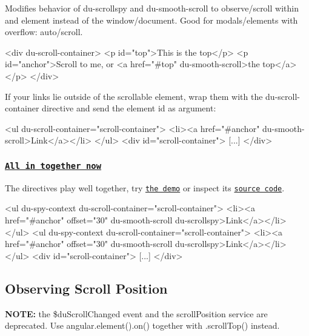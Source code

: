 Modifies behavior of {\ttfamily du-\/scrollspy} and {\ttfamily du-\/smooth-\/scroll} to observe/scroll within and element instead of the window/document. Good for modals/elements with {\ttfamily overflow\+: auto/scroll}.


\begin{DoxyCode}
<div du-scroll-container>
  <p id="top">This is the top</p>
  <p id="anchor">Scroll to me, or <a href="#top" du-smooth-scroll>the top</a></p>
</div>
\end{DoxyCode}


If your links lie outside of the scrollable element, wrap them with the {\ttfamily du-\/scroll-\/container} directive and send the element id as argument\+:


\begin{DoxyCode}
<ul du-scroll-container="scroll-container">
  <li><a href="#anchor" du-smooth-scroll>Link</a></li>
</ul>
<div id="scroll-container">
  [...]
</div>
\end{DoxyCode}


\subsubsection*{\href{http://www.youtube.com/watch?v=cx4KtTezEFg&feature=kp}{\tt All in together now}}

The directives play well together, try \href{http://oblador.github.io/angular-scroll/container.html}{\tt the demo} or inspect its \href{https://github.com/oblador/angular-scroll/blob/master/example/container.html}{\tt source code}.


\begin{DoxyCode}
<ul du-spy-context du-scroll-container="scroll-container">
  <li><a href="#anchor" offset="30" du-smooth-scroll du-scrollspy>Link</a></li>
</ul>
<ul du-spy-context du-scroll-container="scroll-container">
  <li><a href="#anchor" offset="30" du-smooth-scroll du-scrollspy>Link</a></li>
</ul>
<div id="scroll-container">
  [...]
</div>
\end{DoxyCode}


\subsection*{Observing Scroll Position }

{\bfseries N\+O\+TE\+:} the {\ttfamily \$du\+Scroll\+Changed} event and the {\ttfamily scroll\+Position} service are deprecated. Use {\ttfamily angular.\+element().on()} together with {\ttfamily .scroll\+Top()} instead.


